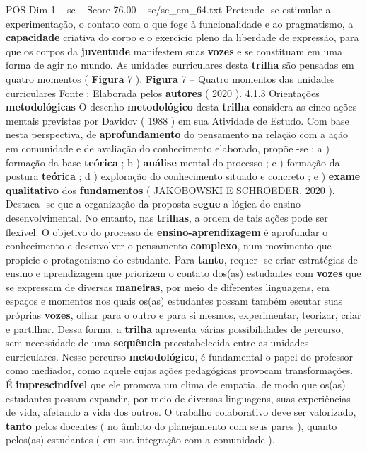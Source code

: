 \begin{textsample}{POS Dim 1 – sc – Score 76.00 – sc/sc\_em\_64.txt}
Pretende -se estimular a experimentação, o contato com o que foge à funcionalidade e ao pragmatismo, a \textbf{capacidade} criativa do corpo e o exercício pleno da liberdade de expressão, para que os corpos da \textbf{juventude} manifestem suas \textbf{vozes} e se constituam em uma forma de agir no mundo.
As unidades curriculares desta \textbf{trilha} são pensadas em quatro momentos ( \textbf{Figura} 7 ). \textbf{Figura} 7 – Quatro momentos das unidades curriculares Fonte : Elaborada pelos \textbf{autores} ( 2020 ). 4.1.3 Orientações \textbf{metodológicas} O desenho \textbf{metodológico} desta \textbf{trilha} considera as cinco ações mentais previstas por Davidov ( 1988 ) em sua Atividade de Estudo.
Com base nesta perspectiva, de \textbf{aprofundamento} do pensamento na relação com a ação em comunidade e de avaliação do conhecimento elaborado, propõe -se : a ) formação da base \textbf{teórica} ; b ) \textbf{análise} mental do processo ; c ) formação da postura \textbf{teórica} ; d ) exploração do conhecimento situado e concreto ; e ) \textbf{exame} \textbf{qualitativo} dos \textbf{fundamentos} ( JAKOBOWSKI E SCHROEDER, 2020 ).
Destaca -se que a organização da proposta \textbf{segue} a lógica do ensino desenvolvimental.
No entanto, nas \textbf{trilhas}, a ordem de tais ações pode ser flexível.
O objetivo do processo de \textbf{ensino-aprendizagem} é aprofundar o conhecimento e desenvolver o pensamento \textbf{complexo}, num movimento que propicie o protagonismo do estudante.
Para \textbf{tanto}, requer -se criar estratégias de ensino e aprendizagem que priorizem o contato dos(as) estudantes com \textbf{vozes} que se expressam de diversas \textbf{maneiras}, por meio de diferentes linguagens, em espaços e momentos nos quais os(as) estudantes possam também escutar suas próprias \textbf{vozes}, olhar para o outro e para si mesmos, experimentar, teorizar, criar e partilhar.
Dessa forma, a \textbf{trilha} apresenta várias possibilidades de percurso, sem necessidade de uma \textbf{sequência} preestabelecida entre as unidades curriculares.
Nesse percurso \textbf{metodológico}, é fundamental o papel do professor como mediador, como aquele cujas ações pedagógicas provocam transformações.
É \textbf{imprescindível} que ele promova um clima de empatia, de modo que os(as) estudantes possam expandir, por meio de diversas linguagens, suas experiências de vida, afetando a vida dos outros.
O trabalho colaborativo deve ser valorizado, \textbf{tanto} pelos docentes ( no âmbito do planejamento com seus pares ), quanto pelos(as) estudantes ( em sua integração com a comunidade ).

\end{textsample}
